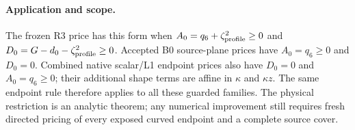 \documentclass[11pt]{article}
\begin{document}
\paragraph{Application and scope.}
The frozen R3 price has this form when
$A_0=q_6+\zeta_{\rm profile}^2\geq0$ and
$D_0=G-d_0-\zeta_{\rm profile}^2\geq0$.
Accepted B0 source-plane prices have $A_0=q_6\geq0$ and $D_0=0$.
Combined native scalar/L1 endpoint prices also have $D_0=0$ and
$A_0=q_6\geq0$; their additional shape terms are affine in
$\kappa$ and $\kappa z$.
The same endpoint rule therefore applies to all these guarded
families.  The physical restriction is an analytic theorem;
any numerical improvement still requires fresh directed pricing
of every exposed curved endpoint and a complete source cover.


\end{document}

